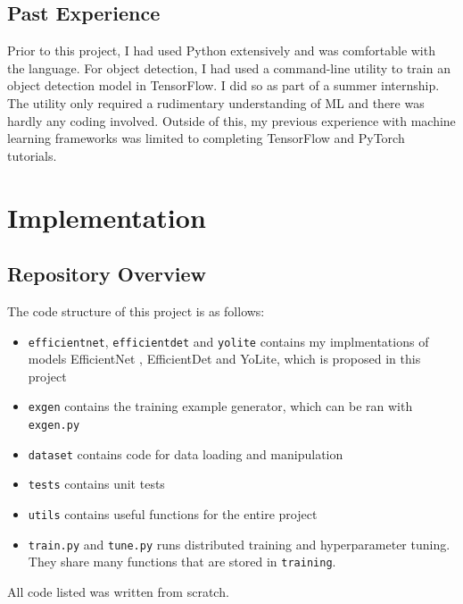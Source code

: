\documentclass[12pt,a4paper,twoside,openany]{report}
\begin{document}
\section{Past Experience}
Prior to this project, I had used Python extensively and was comfortable with the language. For object detection, I had used a command-line utility to train an object detection model in TensorFlow. I did so as part of a summer internship. The utility only required a rudimentary understanding of ML and there was hardly any coding involved. Outside of this, my previous experience with machine learning frameworks was limited to completing TensorFlow and PyTorch tutorials.

\chapter{Implementation}
\section{Repository Overview}
The code structure of this project is as follows:
\begin{center}
    
\end{center}
\begin{itemize}
    \item \verb|efficientnet|, \verb|efficientdet| and \verb|yolite| contains my implmentations of models EfficientNet \cite{tan_efficientnet_2020}, EfficientDet \cite{tan_efficientdet_2020} and YoLite, which is proposed in this project
    \item \verb|exgen| contains the training example generator, which can be ran with \verb|exgen.py|
    \item \verb|dataset| contains code for data loading and manipulation
    \item \verb|tests| contains unit tests
    \item \verb|utils| contains useful functions for the entire project
    \item \verb|train.py| and \verb|tune.py| runs distributed training and hyperparameter tuning. They share many functions that are stored in \verb|training|. 
\end{itemize}

All code listed was written from scratch. 
\end{document}
